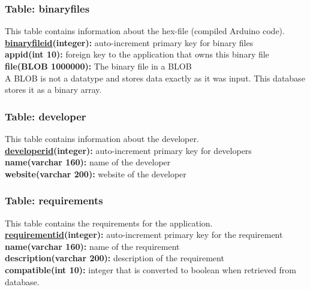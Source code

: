 		\subsubsection{Table: binaryfiles}

			This table contains information about the hex-file (compiled Arduino code). \\
			
			{\bf \underline{binaryfileid}(integer):} auto-increment primary key for binary files \\
			\textbf{appid(int 10):} foreign key to the application that owns this binary file \\
			\textbf{file(BLOB 1000000):} The binary file in a BLOB \\

			A BLOB is not a datatype and stores data exactly as it was input. This database stores it as a binary array.

		\subsubsection{Table: developer}

			This table contains information about the developer.\\
			
			{\bf \underline{developerid}(integer):} auto-increment primary key for developers \\
			\textbf{name(varchar 160):} name of the developer \\
			\textbf{website(varchar 200):} website of the developer \\

		\subsubsection{Table: requirements}

			This table contains the requirements for the application.\\
			
			{\bf \underline{requirementid}(integer):} auto-increment primary key for the requirement \\
			\textbf{name(varchar 160):} name of the requirement \\
			\textbf{description(varchar 200):} description of the requirement \\
			\textbf{compatible(int 10):} integer that is converted to boolean when retrieved from database. \\

